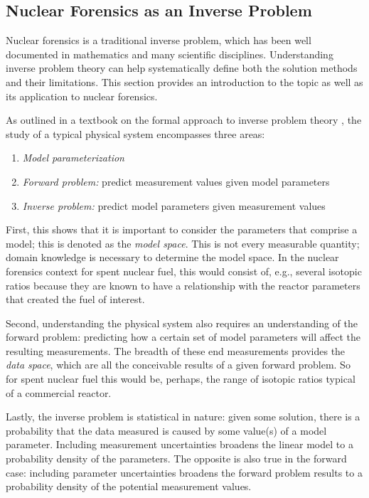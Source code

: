 \subsection{Nuclear Forensics as an Inverse Problem}
\label{sec:inverse}

Nuclear forensics is a traditional inverse problem, which has been well
documented in mathematics and many scientific disciplines.  Understanding
inverse problem theory can help systematically define both the solution methods
and their limitations. This section provides an introduction to the topic as
well as its application to nuclear forensics. 

As outlined in a textbook on the formal approach to inverse problem theory
\cite{inverse_theory}, the study of a typical physical system encompasses three
areas:
\begin{enumerate}
  \itemsep-0.75em
  \item \textit{Model parameterization}
  \item \textit{Forward problem:} predict measurement values given model parameters
  \item \textit{Inverse problem:} predict model parameters given measurement values
\end{enumerate}

First, this shows that it is important to consider the parameters that comprise
a model; this is denoted as the \textit{model space}. This is not every
measurable quantity; domain knowledge is necessary to determine the model
space. In the nuclear forensics context for spent nuclear fuel, this would
consist of, e.g., several isotopic ratios because they are known to have a
relationship with the reactor parameters that created the fuel of interest.

Second, understanding the physical system also requires an understanding of the
forward problem: predicting how a certain set of model parameters will affect
the resulting measurements. The breadth of these end measurements provides the
\textit{data space}, which are all the conceivable results of a given forward
problem. So for spent nuclear fuel this would be, perhaps, the range of
isotopic ratios typical of a commercial reactor. 

Lastly, the inverse problem is statistical in nature: given some solution,
there is a probability that the data measured is caused by some value(s) of a
model parameter. Including measurement uncertainties broadens the linear model
to a probability density of the parameters. The opposite is also true in the
forward case: including parameter uncertainties broadens the forward problem
results to a probability density of the potential measurement values.

